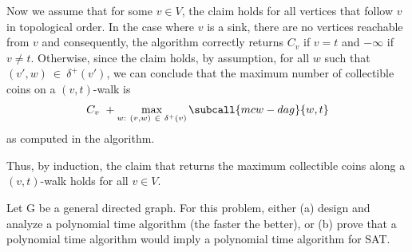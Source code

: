 \documentclass{article}
\begin{document}
\begin{solution}
\begin{subproof} [Correctness]
Now we assume that for some \( v \in V \), the claim holds for all vertices that follow \( v \) in topological order. In the case where \( v \) is a sink, there are no vertices reachable from \( v \) and consequently, the algorithm correctly returns \( C_v \) if \( v=t \) and \( -\infty \) if \( v \not= t \). Otherwise, since the claim holds, by assumption, for all \( w \) such that \( (v',w) \ \in \ \delta^{+}(v') \), we can conclude that the maximum number of collectible coins on a \( (v, t) \)-walk is
\begin{align*}
    C_{v} \ + \max_{w : \ (v,w) \ \in \ \delta^{+}(v)} \subcall{mcw-dag}{w, t}
\end{align*}
as computed in the algorithm.

Thus, by induction, the claim that  returns the maximum collectible coins along a \( (v,t) \)-walk holds for all \( v \in V \).
\end{subproof}

\end{solution}
\pagebreak



\begin{subexercise}
Let G be a general directed graph.
For this problem, either (a) design and analyze a polynomial time algorithm (the faster the better), or (b) prove that a polynomial time algorithm would imply a polynomial time algorithm for SAT.
\end{subexercise}
\end{document}
